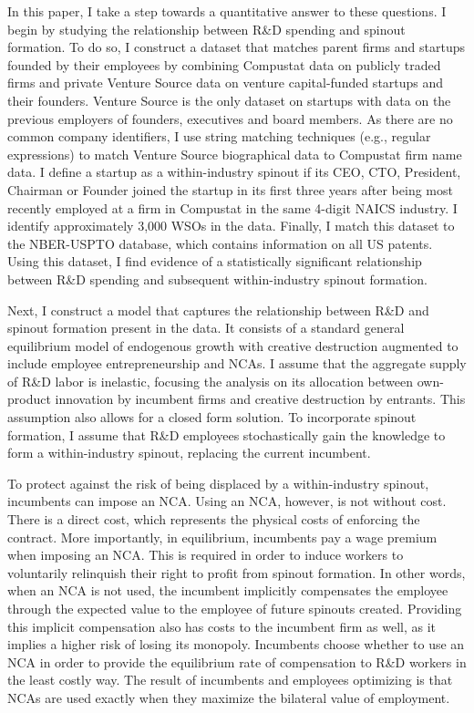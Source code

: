\documentclass[11pt,english]{article}
\theoremstyle{definition}
\begin{document}
In this paper, I take a step towards a quantitative answer to these questions. I begin by studying the relationship between R\&D spending and spinout formation. To do so, I construct a dataset that matches parent firms and startups founded by their employees by combining Compustat data on publicly traded firms and private Venture Source data on venture capital-funded startups and their founders. Venture Source is the only dataset on startups with data on the previous employers of founders, executives and board members. As there are no common company identifiers, I use string matching techniques (e.g., regular expressions) to match Venture Source biographical data to Compustat firm name data. I define a startup as a within-industry spinout if its CEO, CTO, President, Chairman or Founder joined the startup in its first three years after being most recently employed at a firm in Compustat in the same 4-digit NAICS industry. I identify approximately 3,000 WSOs in the data. Finally, I match this dataset to the NBER-USPTO database, which contains information on all US patents. Using this dataset, I find evidence of a statistically significant relationship between R\&D spending and subsequent within-industry spinout formation. 

Next, I construct a model that captures the relationship between R\&D and spinout formation present in the data. It consists of a standard general equilibrium model of endogenous growth with creative destruction augmented to include employee entrepreneurship and NCAs. I assume that the aggregate supply of R\&D labor is inelastic, focusing the analysis on its allocation between own-product innovation by incumbent firms and creative destruction by entrants. This assumption also allows for a closed form solution. To incorporate spinout formation, I assume that R\&D employees stochastically gain the knowledge to form a within-industry spinout, replacing the current incumbent. 

To protect against the risk of being displaced by a within-industry spinout, incumbents can impose an NCA. Using an NCA, however, is not without cost. There is a direct cost, which represents the physical costs of enforcing the contract. More importantly, in equilibrium, incumbents pay a wage premium when imposing an NCA. This is required in order to induce workers to voluntarily relinquish their right to profit from spinout formation. In other words, when an NCA is not used, the incumbent implicitly compensates the employee through the expected value to the employee of future spinouts created. Providing this implicit compensation also has costs to the incumbent firm as well, as it implies a higher risk of losing its monopoly. Incumbents choose whether to use an NCA in order to provide the equilibrium rate of compensation to R\&D workers in the least costly way. The result of incumbents and employees optimizing is that NCAs are used exactly when they maximize the bilateral value of employment. 
\end{document}
